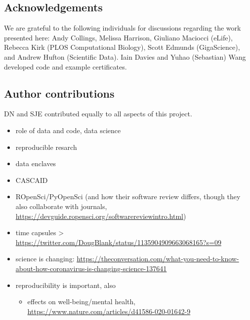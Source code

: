 \documentclass[12pt]{article}
\begin{document}
\subsection*{Acknowledgements}\label{acknowledgements}

We are grateful to the following individuals for discussions regarding
the work presented here: Andy Collings, Melissa Harrison, Giuliano
Maciocci (eLife), Rebecca Kirk (PLOS Computational Biology), Scott
Edmunds (GigaScience), and Andrew Hufton (Scientific Data). Iain Davies and
Yuhao (Sebastian) Wang developed code and example certificates.

\subsection*{Author contributions}

DN and SJE contributed equally to all aspects of this project.

{\small
}


\clearpage
\begin{itemize}
\item
  role of data and code, data science
\item
  reproducible resarch
\item
  data enclaves
\item
  CASCAID
\item
  ROpenSci/PyOpenSci (and how their software review differs, though they
  also collaborate with journals,
  \url{https://devguide.ropensci.org/softwarereviewintro.html})
\item
  time capsules \textgreater{}
  \url{https://twitter.com/DougBlank/status/1135904909663068165?s=09}
\item
  science is changing:
  \url{https://theconversation.com/what-you-need-to-know-about-how-coronavirus-is-changing-science-137641}
\item
  reproducibility is important, also

  \begin{itemize}
  \item
    effects on well-being/mental health,
    \url{https://www.nature.com/articles/d41586-020-01642-9}
  \end{itemize}
\end{itemize}
\end{document}
